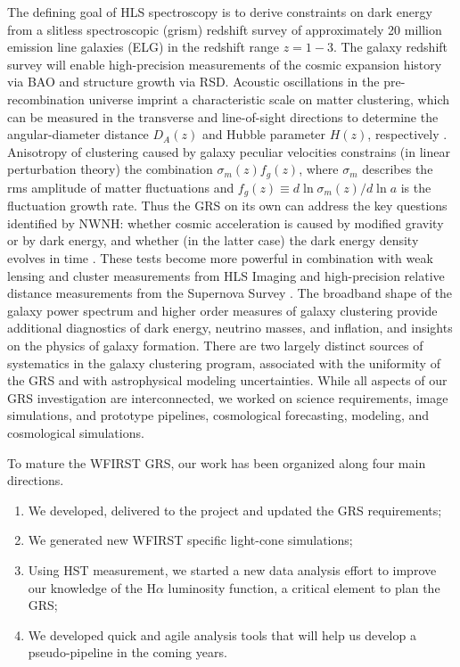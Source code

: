 The defining goal of HLS spectroscopy is to derive constraints on dark energy
from a slitless spectroscopic (grism) redshift survey of approximately 20
million emission line galaxies (ELG) in the redshift range $z=1-3$. The galaxy
redshift survey will enable high-precision measurements of the cosmic expansion
history via BAO and structure growth via RSD. Acoustic oscillations in the
pre-recombination universe imprint a characteristic scale on matter clustering,
which can be measured in the transverse and line-of-sight directions to
determine the angular-diameter distance $D_A(z)$ and Hubble parameter $H(z)$,
respectively \cite{Blake03,Seo03,CW12}.  Anisotropy of clustering caused by
galaxy peculiar velocities constrains (in linear perturbation theory) the
combination $\sigma_m(z) f_g(z)$, where $\sigma_m$ describes the rms amplitude
of matter fluctuations and $f_g(z) \equiv d\ln\sigma_m(z)/d\ln a$ is the
fluctuation growth rate. Thus the GRS on its own can address the key questions
identified by NWNH\@: whether cosmic acceleration is caused by modified gravity
or by dark energy, and whether (in the latter case) the dark energy density
evolves in time \cite{Guzzo08,Wang08}.  These tests become more powerful in
combination with weak lensing and cluster measurements from HLS Imaging and
high-precision relative distance measurements from the Supernova Survey
\cite{dePutter:2013xda,dePutter:2013nha}. The broadband shape of the galaxy
power spectrum and higher order measures of galaxy clustering provide additional
diagnostics of dark energy, neutrino masses, and inflation, and insights on the
physics of galaxy formation. There are two largely distinct sources of
systematics in the galaxy clustering program, associated with the uniformity of
the GRS and with astrophysical modeling uncertainties. While all aspects of our
GRS investigation are interconnected, we worked on science requirements, image simulations,
and prototype pipelines, cosmological forecasting, modeling, and cosmological simulations.

\begin{summary}
To mature the WFIRST GRS, our work has been organized along four main directions.
\begin{enumerate}
\item We developed, delivered to the project and updated the GRS requirements;
\item We generated new WFIRST specific light-cone simulations;
\item Using HST measurement, we started a new data analysis effort to improve our knowledge of the H$\alpha$ luminosity function, a critical element to plan the GRS;
\item We developed quick and agile analysis tools that will help us develop a pseudo-pipeline in the coming years.
\end{enumerate}
\end{summary}


